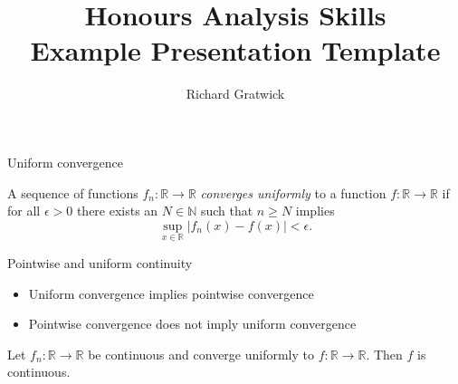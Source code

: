 \documentclass{beamer}		%
\date{}	%
\title[Template]{Honours Analysis Skills\\Example Presentation Template}	%
\author[R Gratwick]{Richard Gratwick} %
\institute[UoE]{University of Edinburgh} %
\begin{document}


\begin{frame}	

\titlepage	%
	
\end{frame}		



\begin{frame}{Uniform convergence}	

\begin{definition}	%

A sequence of functions $f_n \colon \mathbb{R} \to \mathbb{R}$ \emph{converges uniformly} to a function $f \colon \mathbb{R} \to \mathbb{R}$ if for all $\epsilon > 0$ there exists an $N \in \mathbb{N}$ such that $n \geq N$ implies 
\[
\sup_{x \in \mathbb{R}} |f_n(x) - f(x)| < \epsilon.
\]

\end{definition}

\pause	%

\begin{block}{Pointwise and uniform continuity} %

\begin{itemize}
\item Uniform convergence implies pointwise convergence
\item Pointwise convergence does not imply uniform convergence
\end{itemize}

\end{block}

\pause

\begin{theorem}
Let $f_n \colon\mathbb{R} \to \mathbb{R}$ be continuous and converge uniformly to $f \colon \mathbb{R} \to \mathbb{R}$.  Then $f$ is continuous.
\end{theorem}

\end{frame}
\end{document}
